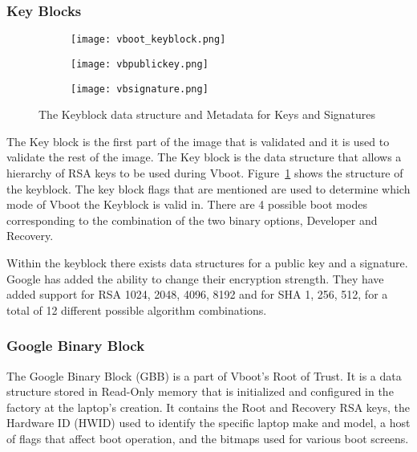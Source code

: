 \subsubsection{Key Blocks}

\begin{figure}
\begin{subfigure}{.5\textwidth}
  \centering
  \texttt{[image: vboot\_keyblock.png]}
\end{subfigure}
\begin{subfigure}{.20\textwidth}
  \centering
  \texttt{[image: vbpublickey.png]}
\end{subfigure}
\begin{subfigure}{.20\textwidth}
  \centering
  \texttt{[image: vbsignature.png]}
\end{subfigure}
\caption{The Keyblock data structure and Metadata for Keys and Signatures}
\label{fig:vboot_keyblock}
\end{figure}

The Key block is the first part of the image that is validated and it is used to validate the rest of the image.
The Key block is the data structure that allows a hierarchy of RSA keys to be used during Vboot.
Figure~\ref{fig:vboot_keyblock} shows the structure of the keyblock. 
The key block flags that are mentioned are used to determine which mode of Vboot the Keyblock is valid in. 
There are 4 possible boot modes corresponding to the combination of the two binary options, Developer and Recovery.

Within the keyblock there exists data structures for a public key and a signature.
Google has added the ability to change their encryption strength.
They have added support for RSA 1024, 2048, 4096, 8192 and for SHA 1, 256, 512, for a total of 12 different possible algorithm combinations.

\subsubsection{Google Binary Block}

The Google Binary Block (GBB) is a part of Vboot's Root of Trust.
It is a data structure stored in Read-Only memory that is initialized and configured in the factory at the laptop's creation.
It contains the Root and Recovery RSA keys, the Hardware ID (HWID) used to identify the specific laptop make and model, a host of flags that affect boot operation, and the bitmaps used for various boot screens.

